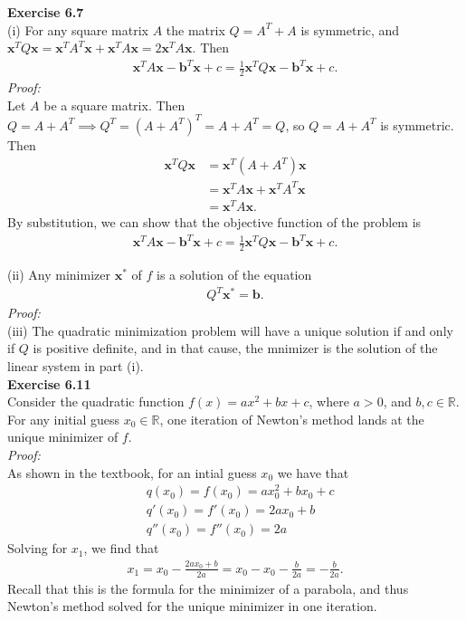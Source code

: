 \documentclass[letterpaper,12pt]{article}
\let\vec\mathbf
\theoremstyle{definition}
\begin{document}
\textbf{Exercise 6.7} \\
(i) For any square matrix $A$ the matrix $Q = A^T + A$ is symmetric, and $\vec{x}^TQ\vec{x} = \vec{x}^TA^T\vec{x} + \vec{x}^TA\vec{x} = 2\vec{x}^TA\vec{x}$. Then
\begin{align*}
  \vec{x}^TA\vec{x} - \vec{b}^T\vec{x} + c = \frac{1}{2}\vec{x}^TQ\vec{x} - \vec{b}^T\vec{x} + c.
\end{align*}
\textit{Proof:} \\
Let $A$ be a square matrix. Then $Q = A + A^T \implies Q^T = (A + A^T)^T = A + A^T = Q$, so $Q = A + A^T$ is symmetric. Then
\begin{align*}
  \vec{x}^TQ\vec{x}
  &= \vec{x}^T(A + A^T)\vec{x} \\
  &= \vec{x}^TA\vec{x} + \vec{x}^TA^T\vec{x} \\
  &= \vec{x}^TA\vec{x}.
\end{align*}
By substitution, we can show that the objective function of the problem is
\begin{align*}
  \vec{x}^TA\vec{x} - \vec{b}^T\vec{x} + c = \frac{1}{2}\vec{x}^TQ\vec{x} - \vec{b}^T\vec{x} + c.
\end{align*}

(ii) Any minimizer $\vec{x}^*$ of $f$ is a solution of the equation
\begin{align*}
  Q^T\vec{x}^* = \vec{b}.
\end{align*}
\textit{Proof:} \\

(iii) The quadratic minimization problem will have a unique solution if and only if $Q$ is positive definite, and in that cause, the mnimizer is the solution of the linear system in part (i). \\

\textbf{Exercise 6.11} \\
Consider the quadratic function $f(x)=ax^2+bx+c$, where $a>0$, and $b,c \in \mathbb{R}$. For any initial guess $x_0 \in \mathbb{R}$, one iteration of Newton's method lands at the unique minimizer of $f$.\\
\textit{Proof:} \\
As shown in the textbook, for an intial guess $x_0$ we have that
\begin{align*}
  & q(x_0) = f(x_0) = ax_0^2 + bx_0 + c \\
  & q'(x_0) = f'(x_0) = 2ax_0 + b \\
  & q''(x_0) = f''(x_0) = 2a
\end{align*}
Solving for $x_1$, we find that
\begin{align*}
  x_1 = x_0 - \frac{2ax_0 + b}{2a} = x_0 - x_0 - \frac{b}{2a} = - \frac{b}{2a}.
\end{align*}
Recall that this is the formula for the minimizer of a parabola, and thus Newton's method solved for the unique minimizer in one iteration. \\
\end{document}
